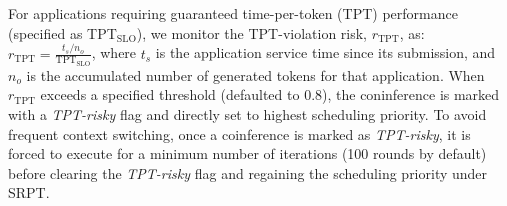 For applications requiring guaranteed time-per-token (TPT) performance (specified as TPT$_\text{SLO}$), we monitor the TPT-violation risk, $r_\text{TPT}$, as:
$r_\text{TPT} = \frac{t_s / n_o}{\text{TPT}_\text{SLO}}$,
where $t_s$ is the application service time since its submission, and $n_o$ is the accumulated number of generated tokens for that application.
When $r_\text{TPT}$ exceeds a specified threshold (defaulted to 0.8), the coninference is marked with a \emph{TPT-risky} flag and directly set to highest scheduling priority. 
To avoid frequent context switching, once a coinference is marked as \emph{TPT-risky}, it is forced to execute for a minimum number of iterations (100 rounds by default) before clearing the \emph{TPT-risky} flag and regaining the scheduling priority under SRPT.




